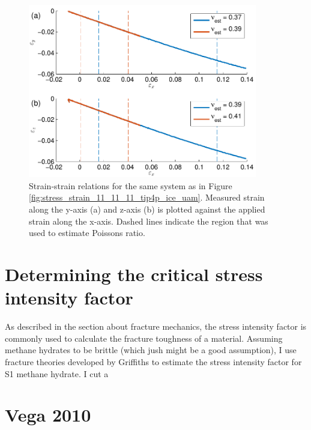 \begin{figure}
\includegraphics[width=10cm]{../figures/thesis/strain_strain_11_11_11_y_z_poisson_tip4p_ice_uam.pdf}
\caption{Strain-strain relations for the same system as in Figure \ref{fig:stress_strain_11_11_11_tip4p_ice_uam}. Measured strain along the y-axis (a) and z-axis (b) is plotted against the applied strain along the x-axis. Dashed lines indicate the region that was used to estimate Poissons ratio.}
\label{fig:strain_strain_11_11_11_y_z_poisson_tip4p_ice_uam}

\end{figure}

\section{Determining the critical stress intensity factor}
As described in the section about fracture mechanics, the stress intensity factor is commonly used to calculate the fracture toughness of a material. Assuming methane hydrates to be brittle (which jush might be a good assumption), I use fracture theories developed by Griffiths to estimate the stress intensity factor for S1 methane hydrate. I cut a 

\section{Vega 2010}

